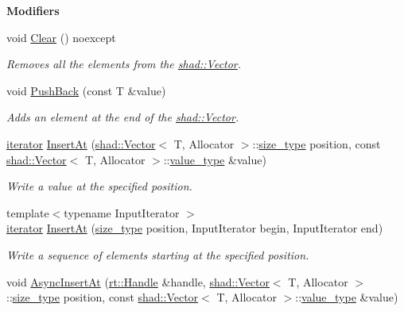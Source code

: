 \begin{Indent}{\bf Modifiers}\par
\begin{DoxyCompactItemize}
\item 
void \hyperlink{classshad_1_1Vector_abaa9f4f6a5d0d029b7b09b207a881e01}{Clear} () noexcept
\begin{DoxyCompactList}\small\item\em Removes all the elements from the \hyperlink{classshad_1_1Vector}{shad\-::\-Vector}. \end{DoxyCompactList}\item 
void \hyperlink{classshad_1_1Vector_a4b843e22db538e31fe5388266bec27b7}{Push\-Back} (const T \&value)
\begin{DoxyCompactList}\small\item\em Adds an element at the end of the \hyperlink{classshad_1_1Vector}{shad\-::\-Vector}. \end{DoxyCompactList}\item 
\hyperlink{classshad_1_1Vector_aaa71fd41daa1548f8436bc54ef507976}{iterator} \hyperlink{classshad_1_1Vector_afcaff7d0c02745c89349c19ccba6848a}{Insert\-At} (\hyperlink{classshad_1_1Vector}{shad\-::\-Vector}$<$ T, Allocator $>$\-::\hyperlink{classshad_1_1Vector_a1c97f4eb87d738cb4de97e5b3587c397}{size\-\_\-type} position, const \hyperlink{classshad_1_1Vector}{shad\-::\-Vector}$<$ T, Allocator $>$\-::\hyperlink{classshad_1_1Vector_adb97b89826617473f44b4bb1dd3308ba}{value\-\_\-type} \&value)
\begin{DoxyCompactList}\small\item\em Write a value at the specified position. \end{DoxyCompactList}\item 
{\footnotesize template$<$typename Input\-Iterator $>$ }\\\hyperlink{classshad_1_1Vector_aaa71fd41daa1548f8436bc54ef507976}{iterator} \hyperlink{classshad_1_1Vector_af6f11691760337b76c49f18db0f10b05}{Insert\-At} (\hyperlink{classshad_1_1Vector_a1c97f4eb87d738cb4de97e5b3587c397}{size\-\_\-type} position, Input\-Iterator begin, Input\-Iterator end)
\begin{DoxyCompactList}\small\item\em Write a sequence of elements starting at the specified position. \end{DoxyCompactList}\item 
void \hyperlink{classshad_1_1Vector_ae57e459d60d2e5e226ca8e1071582c23}{Async\-Insert\-At} (\hyperlink{classshad_1_1rt_1_1Handle}{rt\-::\-Handle} \&handle, \hyperlink{classshad_1_1Vector}{shad\-::\-Vector}$<$ T, Allocator $>$\-::\hyperlink{classshad_1_1Vector_a1c97f4eb87d738cb4de97e5b3587c397}{size\-\_\-type} position, const \hyperlink{classshad_1_1Vector}{shad\-::\-Vector}$<$ T, Allocator $>$\-::\hyperlink{classshad_1_1Vector_adb97b89826617473f44b4bb1dd3308ba}{value\-\_\-type} \&value)

\end{DoxyCompactItemize}
\end{Indent}
